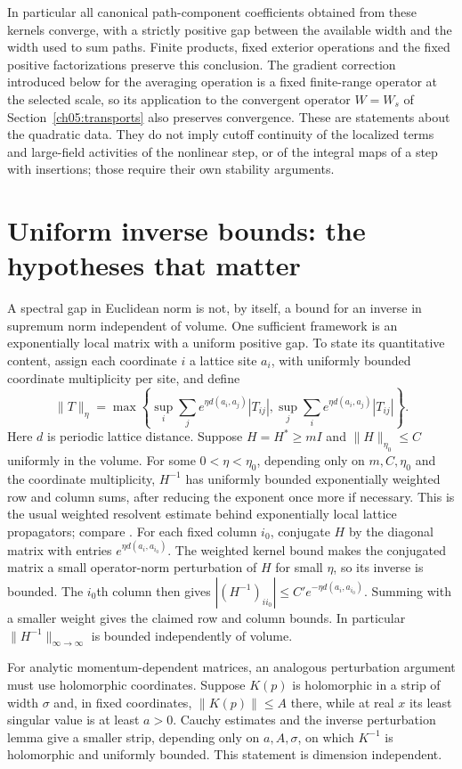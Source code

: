 In particular all canonical path-component coefficients obtained from these
kernels converge, with a strictly positive gap between the available width and
the width used to sum paths. Finite products, fixed exterior operations
and the fixed positive factorizations preserve this conclusion. The
gradient correction introduced below for the averaging operation is a fixed finite-range
operator at the selected scale, so its application to the convergent
operator $W=W_s$ of Section~\ref{ch05:transports} also preserves convergence. These are statements
about the quadratic data. They do not imply cutoff continuity of the
localized terms and large-field activities of the nonlinear step, or of the integral maps of a step with insertions; those require
their own stability arguments.

\section{Uniform inverse bounds: the hypotheses that matter}
\label{ch05:inverse}

A spectral gap in Euclidean norm is not, by itself, a bound for an
inverse in supremum norm independent of volume. One sufficient
framework is an exponentially local matrix with a uniform positive
gap. To state its quantitative content, assign each coordinate $i$
a lattice site $a_i$, with uniformly bounded coordinate multiplicity
per site, and define
\[
 \|T\|_\eta=\max\left\{
 \sup_i\sum_j e^{\eta d(a_i,a_j)}|T_{ij}|,
 \sup_j\sum_i e^{\eta d(a_i,a_j)}|T_{ij}|\right\}.
\]
Here $d$ is periodic lattice distance. Suppose $H=H^*\ge mI$ and
$\|H\|_{\eta_0}\le C$ uniformly in the volume.
For some $0<\eta<\eta_0$, depending only on $m,C,\eta_0$ and the
coordinate multiplicity, $H^{-1}$ has uniformly bounded
exponentially weighted row and column sums, after reducing the
exponent once more if necessary. This is the usual weighted
resolvent estimate behind exponentially local lattice propagators;
compare \cite{Balaban1984Propagators}.
For each fixed column $i_0$, conjugate $H$ by the diagonal matrix
with entries $e^{\eta d(a_i,a_{i_0})}$. The weighted kernel bound makes
the conjugated matrix a small operator-norm perturbation of $H$ for small
$\eta$, so its inverse is bounded. The $i_0$th column then gives
$|(H^{-1})_{ii_0}|\le C'e^{-\eta d(a_i,a_{i_0})}$. Summing with a
smaller weight gives the claimed row and column bounds. In particular
$\|H^{-1}\|_{\infty\to\infty}$ is bounded independently of volume.

For analytic momentum-dependent matrices, an analogous perturbation
argument must use holomorphic coordinates. Suppose $K(p)$ is
holomorphic in a strip of width $\sigma$ and, in fixed coordinates,
$\|K(p)\|\le A$ there, while at real $x$ its least singular value
is at least $a>0$. Cauchy estimates and the inverse perturbation
lemma give a smaller strip, depending only on $a,A,\sigma$,
on which $K^{-1}$ is holomorphic and uniformly bounded. This
statement is dimension independent.

